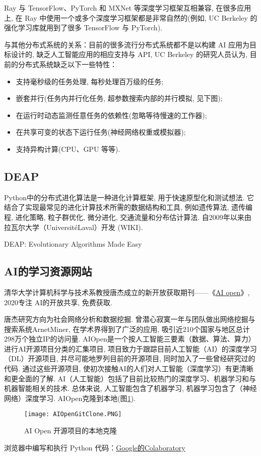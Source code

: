 Ray 与 TensorFlow、PyTorch 和 MXNet 等深度学习框架互相兼容, 在很多应用上, 在 Ray 中使用一个或多个深度学习框架都是非常自然的(例如, UC Berkeley 的强化学习库就用到了很多 TensorFlow 与 PyTorch).

与其他分布式系统的关系：目前的很多流行分布式系统都不是以构建 AI 应用为目标设计的, 缺乏人工智能应用的相应支持与 API, UC Berkeley 的研究人员认为, 目前的分布式系统缺乏以下一些特性：

\begin{itemize}
\item 支持毫秒级的任务处理, 每秒处理百万级的任务;
\item 嵌套并行(任务内并行化任务, 超参数搜索内部的并行模拟, 见下图);
\item 在运行时动态监测任意任务的依赖性(忽略等待慢速的工作器);
\item 在共享可变的状态下运行任务(神经网络权重或模拟器);
\item 支持异构计算(CPU、GPU 等等).
\end{itemize}
\subsection{DEAP}

Python中的分布式进化算法是一种进化计算框架, 用于快速原型化和测试想法. 它结合了实现最常见的进化计算技术所需的数据结构和工具, 例如遗传算法, 遗传编程, 进化策略, 粒子群优化, 微分进化, 交通流量和分布估计算法. 自2009年以来由拉瓦尔大学（UniversitéLaval）开发 (WIKI).

{DEAP}: Evolutionary Algorithms Made Easy \cite{DEAPJMLR2012}
\subsection{AI的学习资源网站}
清华大学计算机科学与技术系教授唐杰成立的新开放获取期刊——《\href{https://www.aiopens.net/main/index.html}{AI open}》, 2020专注 AI的开放共享, 免费获取.

\begin{remark}
唐杰研究方向为社会网络分析和数据挖掘. 曾潜心寂寞一年与团队做出网络挖掘与搜索系统ArnetMiner, 在学术界得到了广泛的应用, 吸引近210个国家与地区总计298万个独立IP的访问量.
AIOpen是一个按人工智能三要素（数据、算法、算力）进行AI开源项目分类的汇集项目, 项目致力于跟踪目前人工智能（AI）的深度学习（DL）开源项目, 并尽可能地罗列目前的开源项目, 同时加入了一些曾经研究过的代码.
通过这些开源项目, 使初次接触AI的人们对人工智能（深度学习）有更清晰和更全面的了解.
AI（人工智能）包括了目前比较热门的深度学习、机器学习和与机器智能相关的技术.
总体来说, 人工智能包含了机器学习, 机器学习包含了（神经网络）深度学习.
AIOpen克隆到本地(图\ref{AIOpenGitClone2020030801}).
\end{remark}
\begin{figure}[H]
\centering
\texttt{[image: AIOpenGitClone.PNG]}
\caption{AI Open 开源项目的本地克隆}
\label{AIOpenGitClone2020030801}
\end{figure}
浏览器中编写和执行 Python 代码：\href{https://colab.research.google.com/notebooks/intro.ipynb}{Google的Colaboratory}

